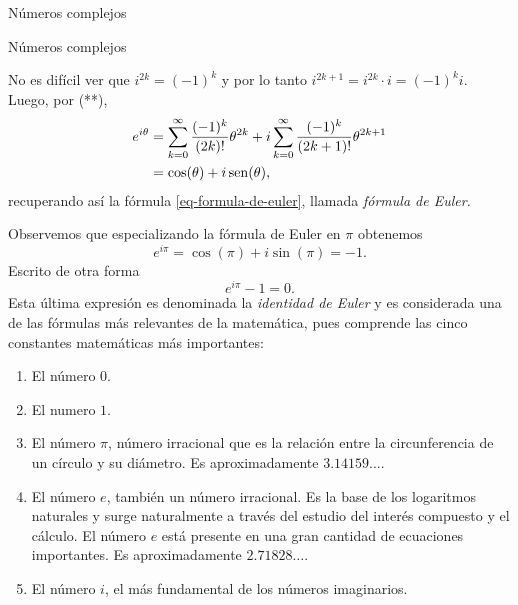 \begin{chapter}{N\'umeros complejos}
\begin{section}{N\'umeros complejos}
\begin{observacion*}
        No es difícil ver que $i^{2k} = (-1)^k$ y por lo tanto $i^{2k+1} = i^{2k}\cdot i = (-1)^ki $. Luego, por (**),
        \begin{align*}
            e^{i\theta} & =  \sum_{k=0}^{\infty} \frac{(-1)^k}{(2k)!}\theta^{2k}  + i\sum_{k=0}^{\infty} \frac{ (-1)^k}{(2k+1)!}\theta^{2k+1} \\
                        & =\cos(\theta) + i \operatorname{sen}(\theta),
        \end{align*}
        recuperando así  la fórmula \eqref{eq-formula-de-euler}, llamada \emph{fórmula de Euler.}
    \end{observacion*}

    \begin{observacion*}  Observemos que especializando la fórmula de Euler en $\pi$ obtenemos
        \begin{equation*}
            e^{i\pi} = \cos(\pi) + i\sin(\pi) = -1.
        \end{equation*}
        Escrito de otra forma
        \begin{equation}
            e^{i\pi} -1 =0.
        \end{equation}
        Esta última expresión es denominada la \emph{identidad de Euler} y es considerada una de las fórmulas más relevantes de la matemática, pues comprende las cinco constantes matemáticas más importantes:
        \begin{enumerate}
            \item El número \boldmath${0}$.
            \item El numero \boldmath${1}$.
            \item El número \boldmath${\pi}$, número irracional  que es la relación entre la circunferencia de un círculo y su diámetro. Es aproximadamente $3.14159\ldots$.
            \item El número \boldmath${e}$, también un número irracional. Es la base de los logaritmos naturales y surge naturalmente a través del estudio del interés compuesto y el cálculo. El número $e$ está presente en una gran cantidad de ecuaciones importantes. Es aproximadamente $2.71828\ldots$.
            \item El número \boldmath$i$, el más fundamental de los números imaginarios.
        \end{enumerate}
    \end{observacion*}
\end{section}


\end{chapter}
